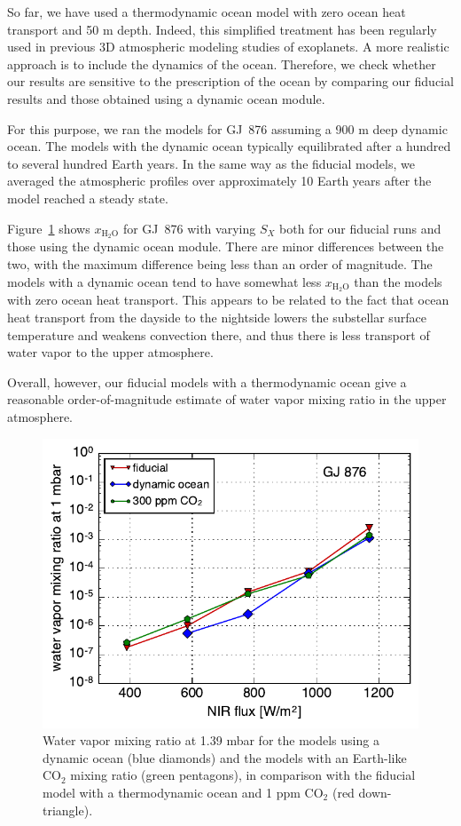 \documentclass[11pt,numberedappendix,twocolappendix,]{emulateapj}
\def\water{H$_2$O}
\def\xwater{$x_\text{\water}$}
\def\wv{water vapor}
\begin{document}
So far, we have used a thermodynamic ocean model with zero ocean heat transport and 50 m depth. 
Indeed, this simplified treatment has been regularly used in previous 3D atmospheric modeling studies of exoplanets. 
A more realistic approach is to include the dynamics of the ocean. 
Therefore, we check whether our results are sensitive to the prescription of the ocean by comparing our fiducial results and those obtained using a dynamic ocean module. 

For this purpose, we ran the models for GJ~876 assuming a 900 m deep dynamic ocean. 
The models with the dynamic ocean typically equilibrated after a hundred to several hundred Earth years. 
In the same way as the fiducial models, we averaged the atmospheric profiles  over approximately 10 Earth years after the model reached a steady state. 

Figure~\ref{fig:change_ocean} shows \xwater{} for GJ~876 with varying $S_X$ both for our fiducial runs and those using the dynamic ocean module.  
There are minor differences between the two, with the maximum difference being less than an order of magnitude. 
The models with a dynamic ocean tend to have somewhat less \xwater{} than the models with zero ocean heat transport. 
This appears to be related to the fact that ocean heat transport from the dayside to the nightside lowers the substellar surface temperature and weakens convection there, and thus there is less transport of water vapor to the upper atmosphere. 

Overall, however, our fiducial models with a thermodynamic ocean give a reasonable order-of-magnitude estimate of \wv{} mixing ratio in the upper atmosphere. 

\begin{figure}[!h]
    \begin{center}
    \includegraphics[width=0.9\hsize]{xH2O_sensitivity.pdf}
    \end{center}
\caption{Water vapor mixing ratio at 1.39 mbar for the models using a dynamic ocean (blue diamonds) and the models with an Earth-like CO$_2$ mixing ratio (green pentagons), in comparison with the fiducial model with a thermodynamic ocean and 1 ppm CO$_2$ (red down-triangle). }
\label{fig:change_ocean}
\end{figure}
\end{document}
